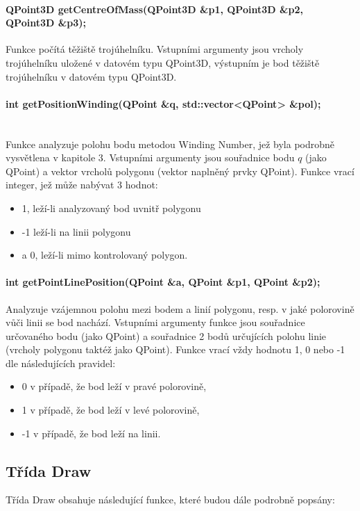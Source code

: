 \documentclass[11pt]{article}
\begin{document}
\paragraph {QPoint3D getCentreOfMass(QPoint3D \&p1, QPoint3D \&p2, QPoint3D \&p3);}
Funkce počítá těžiště trojúhelníku. Vstupními argumenty jsou vrcholy trojúhelníku uložené v datovém typu QPoint3D, výstupním je bod těžiště trojúhelníku v datovém typu QPoint3D. 

\paragraph{int getPositionWinding(QPoint \&q, std::vector<QPoint> \&pol);}\mbox{}\\
Funkce analyzuje polohu bodu metodou Winding Number, jež byla podrobně vysvětlena v kapitole 3.  Vstupními argumenty jsou souřadnice bodu $q$ (jako QPoint) a vektor vrcholů polygonu (vektor naplněný prvky QPoint). Funkce vrací integer, jež může nabývat 3 hodnot:

\begin{itemize}
	\item 1, leží-li analyzovaný bod uvnitř polygonu
	\item -1 leží-li na linii polygonu 
	\item a 0, leží-li mimo kontrolovaný polygon.
\end{itemize}

\paragraph{int getPointLinePosition(QPoint \&a, QPoint \&p1, QPoint \&p2);}
Analyzuje vzájemnou polohu mezi bodem a linií polygonu, resp. v jaké polorovině vůči linii se bod nachází. Vstupními argumenty funkce jsou souřadnice určovaného bodu (jako QPoint) a souřadnice 2 bodů určujících polohu linie (vrcholy polygonu taktéž jako QPoint). Funkce vrací vždy hodnotu 1, 0 nebo -1 dle následujících pravidel:

\begin{itemize}
	\item 0 v případě, že bod leží v pravé polorovině,
	\item 1 v případě, že  bod leží v levé polorovině,
	\item -1 v případě, že bod leží na linii.
\end{itemize}

\subsection{Třída Draw}
Třída Draw obsahuje následující funkce, které budou dále podrobně popsány:
\end{document}
